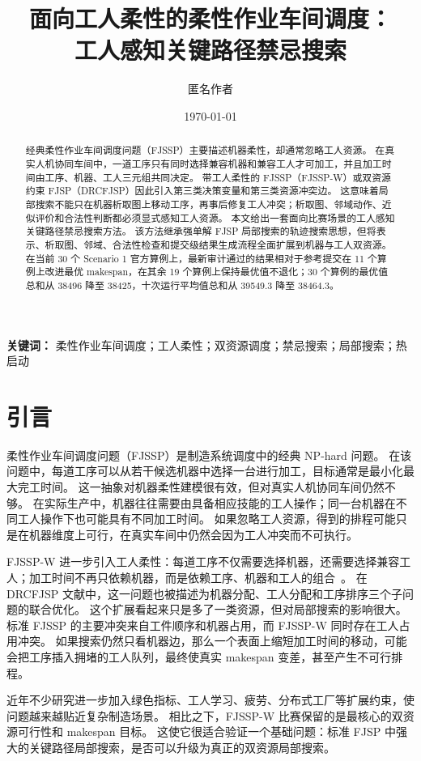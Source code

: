 \documentclass[UTF8,a4paper,zihao=-4]{ctexart}
\title{面向工人柔性的柔性作业车间调度：\\工人感知关键路径禁忌搜索}
\author{匿名作者}
\date{\today}
\begin{document}
\maketitle

\begin{abstract}
经典柔性作业车间调度问题（FJSSP）主要描述机器柔性，却通常忽略工人资源。
在真实人机协同车间中，一道工序只有同时选择兼容机器和兼容工人才可加工，并且加工时间由工序、机器、工人三元组共同决定。
带工人柔性的 FJSSP（FJSSP-W）或双资源约束 FJSP（DRCFJSP）因此引入第三类决策变量和第三类资源冲突边。
这意味着局部搜索不能只在机器析取图上移动工序，再事后修复工人冲突；析取图、邻域动作、近似评价和合法性判断都必须显式感知工人资源。
本文给出一套面向比赛场景的工人感知关键路径禁忌搜索方法。
该方法继承强单解 FJSP 局部搜索的轨迹搜索思想，但将表示、析取图、邻域、合法性检查和提交级结果生成流程全面扩展到机器与工人双资源。
在当前 30 个 Scenario 1 官方算例上，最新审计通过的结果相对于参考提交在 11 个算例上改进最优 makespan，在其余 19 个算例上保持最优值不退化；30 个算例的最优值总和从 38496 降至 38425，十次运行平均值总和从 39549.3 降至 38464.3。
\end{abstract}

\noindent\textbf{关键词：} 柔性作业车间调度；工人柔性；双资源调度；禁忌搜索；局部搜索；热启动

\section{引言}
柔性作业车间调度问题（FJSSP）是制造系统调度中的经典 NP-hard 问题。
在该问题中，每道工序可以从若干候选机器中选择一台进行加工，目标通常是最小化最大完工时间。
这一抽象对机器柔性建模很有效，但对真实人机协同车间仍然不够。
在实际生产中，机器往往需要由具备相应技能的工人操作；同一台机器在不同工人操作下也可能具有不同加工时间。
如果忽略工人资源，得到的排程可能只是在机器维度上可行，在真实车间中仍然会因为工人冲突而不可执行。

FJSSP-W 进一步引入工人柔性：每道工序不仅需要选择机器，还需要选择兼容工人；加工时间不再只依赖机器，而是依赖工序、机器和工人的组合~\cite{gong2018workerflex,gong2020habc,li2025ceamcp,hutter2025benchmark,hutter2024cec}。
在 DRCFJSP 文献中，这一问题也被描述为机器分配、工人分配和工序排序三个子问题的联合优化。
这个扩展看起来只是多了一类资源，但对局部搜索的影响很大。
标准 FJSSP 的主要冲突来自工件顺序和机器占用，而 FJSSP-W 同时存在工人占用冲突。
如果搜索仍然只看机器边，那么一个表面上缩短加工时间的移动，可能会把工序插入拥堵的工人队列，最终使真实 makespan 变差，甚至产生不可行排程。

近年不少研究进一步加入绿色指标、工人学习、疲劳、分布式工厂等扩展约束，使问题越来越贴近复杂制造场景。
相比之下，FJSSP-W 比赛保留的是最核心的双资源可行性和 makespan 目标。
这使它很适合验证一个基础问题：标准 FJSP 中强大的关键路径局部搜索，是否可以升级为真正的双资源局部搜索。
\end{document}
